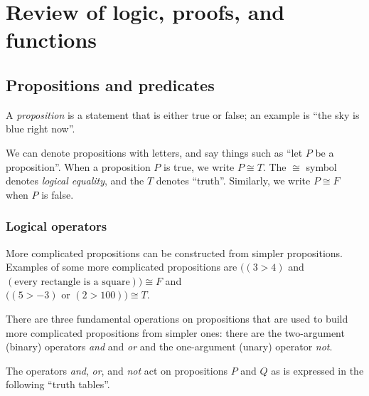\chapter{Review of logic, proofs, and functions}
\label{ch::logic_pf_fns}

\section{Propositions and predicates}

A \textit{proposition} is a statement that is either true or false; an example is ``the sky is blue right now''.

We can denote propositions  with letters, and say things such as ``let $P$ be a proposition''. When a proposition $P$ is true, we write $P \cong T$. The $\cong$ symbol denotes \textit{logical equality}, and the $T$ denotes ``truth''. Similarly, we write $P \cong F$ when $P$ is false.

\subsection*{Logical operators}

More complicated propositions can be constructed from simpler propositions. Examples of some more complicated propositions are $\Big((3 > 4)$ and $(\text{every rectangle is a square}) \Big) \cong F$ and \\ $\Big((5 > -3) \text{ or } (2 > 100)\Big) \cong T$.

There are three fundamental operations on propositions that are used to build more complicated propositions from simpler ones: there are the two-argument (binary) operators \textit{and} and \textit{or} and the one-argument (unary) operator \textit{not}.

The operators \textit{and}, \textit{or}, and \textit{not} act on propositions $P$ and $Q$ as is expressed in the following ``truth tables''.

